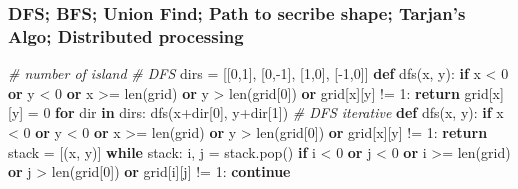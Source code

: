 \documentclass[
]{article}
\newenvironment{Shaded}{}{}
\newcommand{\BuiltInTok}[1]{#1}
\newcommand{\CommentTok}[1]{\textcolor[rgb]{0.38,0.63,0.69}{\textit{#1}}}
\newcommand{\ControlFlowTok}[1]{\textcolor[rgb]{0.00,0.44,0.13}{\textbf{#1}}}
\newcommand{\DecValTok}[1]{\textcolor[rgb]{0.25,0.63,0.44}{#1}}
\newcommand{\KeywordTok}[1]{\textcolor[rgb]{0.00,0.44,0.13}{\textbf{#1}}}
\newcommand{\NormalTok}[1]{#1}
\newcommand{\OperatorTok}[1]{\textcolor[rgb]{0.40,0.40,0.40}{#1}}
\newcommand{\StringTok}[1]{\textcolor[rgb]{0.25,0.44,0.63}{#1}}
\begin{document}
\hypertarget{dfs-bfs-union-find-path-to-secribe-shape-tarjans-algo-distributed-processing}{%
\subsubsection{DFS; BFS; Union Find; Path to secribe shape; Tarjan's
Algo; Distributed
processing}\label{dfs-bfs-union-find-path-to-secribe-shape-tarjans-algo-distributed-processing}}

\begin{Shaded}
\begin{Highlighting}[]
\CommentTok{\# number of island}
\CommentTok{\# DFS }
\NormalTok{dirs }\OperatorTok{=}\NormalTok{ [[}\DecValTok{0}\NormalTok{,}\DecValTok{1}\NormalTok{], [}\DecValTok{0}\NormalTok{,}\OperatorTok{{-}}\DecValTok{1}\NormalTok{], [}\DecValTok{1}\NormalTok{,}\DecValTok{0}\NormalTok{], [}\OperatorTok{{-}}\DecValTok{1}\NormalTok{,}\DecValTok{0}\NormalTok{]]}
\KeywordTok{def}\NormalTok{ dfs(x, y):}
  \ControlFlowTok{if}\NormalTok{ x }\OperatorTok{\textless{}} \DecValTok{0} \KeywordTok{or}\NormalTok{ y }\OperatorTok{\textless{}} \DecValTok{0} \KeywordTok{or}\NormalTok{ x }\OperatorTok{\textgreater{}=} \BuiltInTok{len}\NormalTok{(grid) }\KeywordTok{or}\NormalTok{ y }\OperatorTok{\textgreater{}} \BuiltInTok{len}\NormalTok{(grid[}\DecValTok{0}\NormalTok{]) }\KeywordTok{or}\NormalTok{ grid[x][y] }\OperatorTok{!=} \StringTok{\textquotesingle{}1\textquotesingle{}}\NormalTok{: }\ControlFlowTok{return}
\NormalTok{  grid[x][y] }\OperatorTok{=} \StringTok{\textquotesingle{}0\textquotesingle{}}
  \ControlFlowTok{for} \BuiltInTok{dir} \KeywordTok{in}\NormalTok{ dirs:}
\NormalTok{    dfs(x}\OperatorTok{+}\BuiltInTok{dir}\NormalTok{[}\DecValTok{0}\NormalTok{], y}\OperatorTok{+}\BuiltInTok{dir}\NormalTok{[}\DecValTok{1}\NormalTok{])}
\CommentTok{\# DFS iterative}
\KeywordTok{def}\NormalTok{ dfs(x, y):}
  \ControlFlowTok{if}\NormalTok{ x }\OperatorTok{\textless{}} \DecValTok{0} \KeywordTok{or}\NormalTok{ y }\OperatorTok{\textless{}} \DecValTok{0} \KeywordTok{or}\NormalTok{ x }\OperatorTok{\textgreater{}=} \BuiltInTok{len}\NormalTok{(grid) }\KeywordTok{or}\NormalTok{ y }\OperatorTok{\textgreater{}} \BuiltInTok{len}\NormalTok{(grid[}\DecValTok{0}\NormalTok{]) }\KeywordTok{or}\NormalTok{ grid[x][y] }\OperatorTok{!=} \StringTok{\textquotesingle{}1\textquotesingle{}}\NormalTok{: }\ControlFlowTok{return}
\NormalTok{  stack }\OperatorTok{=}\NormalTok{ [(x, y)]}
  \ControlFlowTok{while}\NormalTok{ stack:}
\NormalTok{    i, j }\OperatorTok{=}\NormalTok{ stack.pop()}
    \ControlFlowTok{if}\NormalTok{ i }\OperatorTok{\textless{}} \DecValTok{0} \KeywordTok{or}\NormalTok{ j }\OperatorTok{\textless{}} \DecValTok{0} \KeywordTok{or}\NormalTok{ i }\OperatorTok{\textgreater{}=} \BuiltInTok{len}\NormalTok{(grid) }\KeywordTok{or}\NormalTok{ j }\OperatorTok{\textgreater{}} \BuiltInTok{len}\NormalTok{(grid[}\DecValTok{0}\NormalTok{]) }\KeywordTok{or}\NormalTok{ grid[i][j] }\OperatorTok{!=} \StringTok{\textquotesingle{}1\textquotesingle{}}\NormalTok{: }\ControlFlowTok{continue}

\end{Highlighting}
\end{Shaded}
\end{document}
